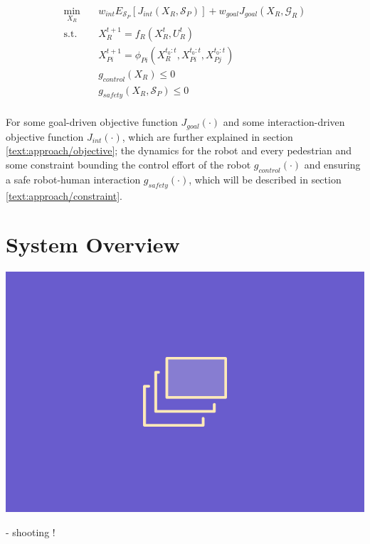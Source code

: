 \begin{align}
\label{eq:formulation}
\min_{X_R} \quad & w_{int} E_{\mathcal{S}_P}[J_{int}(X_R, \mathcal{S}_P)] + w_{goal} J_{goal}(X_R, \mathcal{G}_R) \\
\textrm{s.t. } \quad & X_R^{t+1} = f_R(X_R^t, U_R^t) \\
& X_{Pi}^{t+1} = \phi_{Pi}(X_R^{t_0:t}, X_{Pi}^{t_0:t}, X_{Pj}^{t_0:t}) \\
& g_{control}(X_R) \leq 0 \\
& g_{safety}(X_R, \mathcal{S}_P) \leq 0 \\
\end{align} 

For some goal-driven objective function $J_{goal}(\cdot)$ and some interaction-driven objective function $J_{int}(\cdot)$, which are further explained in section \ref{text:approach/objective}; the dynamics for the robot and every pedestrian and some constraint bounding the control effort of the robot $g_{control}(\cdot)$ and ensuring a safe robot-human interaction $g_{safety}(\cdot)$, which will be described in section \ref{text:approach/constraint}.

\section{System Overview}
\label{text:approach/overview}


\begin{center}
\includegraphics[width=\imgwidth]{images/placeholder.png}
\label{img:information_flow}
\end{center}

- shooting !

